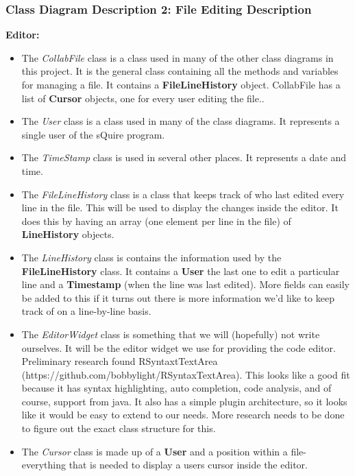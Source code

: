 \documentclass[twoside,letterpaper]{article}
\begin{document}
{\newpage

\subsubsection[Class Diagram Description 2: File Editing Description]{\rmfamily\bfseries\color{black}
	Class Diagram Description 2: File Editing Description}
\hypertarget{RefHeading22059017292}{}

\textbf{Editor:}\\
\begin{itemize}
\item The \textit{CollabFile} class is a class used in many of the other class diagrams in this project. It is the general class containing all the methods and variables for managing a file. It contains a \textbf{FileLineHistory} object. CollabFile has a list of \textbf{Cursor} objects, one for every user editing the file..
  \item The \textit{User} class is a class used in many of the class diagrams. It represents a single user of the sQuire program.
  \item The \textit{TimeStamp} class is used in several other places. It represents a date and time.
	\item The \textit{FileLineHistory} class is a class that keeps track of who last edited every line in the file. This will be used to display the changes inside the editor. It does this by having an array (one element per line in the file) of \textbf{LineHistory} objects.
  \item The \textit{LineHistory} class is contains the information used by the \textbf{FileLineHistory} class. It contains a \textbf{User} {the last one to edit a particular line} and a \textbf{Timestamp} (when the line was last edited). More fields can easily be added to this if it turns out there is more information we'd like to keep track of on a line-by-line basis.
	\item The \textit{EditorWidget} class is something that we will (hopefully) not write ourselves. It will be the editor widget we use for providing the code editor. Preliminary research found RSyntaxtTextArea (https://github.com/bobbylight/RSyntaxTextArea). This looks like a good fit because it has syntax highlighting, auto completion, code analysis, and of course, support from java. It also has a simple plugin architecture, so it looks like it would be easy to extend to our needs. More research needs to be done to figure out the exact class structure for this.
  \item The \textit{Cursor} class is made up of a \textbf{User} and a position within a file- everything that is needed to display a users cursor inside the editor.

\end{itemize}}
\end{document}
